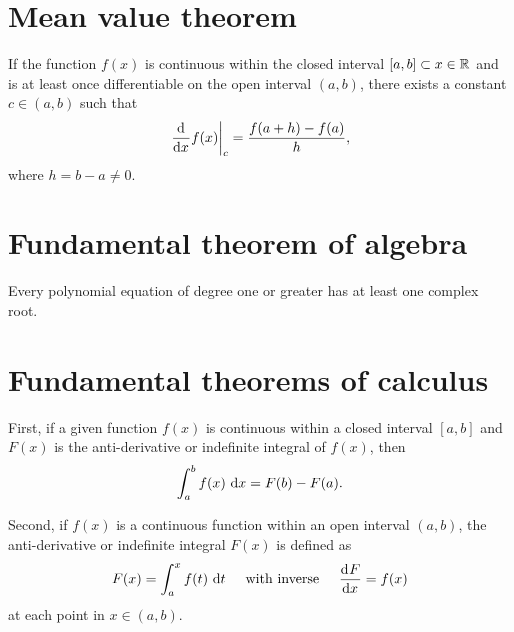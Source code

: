 \section{Mean value theorem} \label{ssn_mean_value_theorem}

\begin{theorem}
\label{mean_value_theorem}
If the function $f(x)$ is continuous within the closed interval $[a,b] \subset x \in \mathbb{R}$ and is at least once differentiable on the open interval $(a,b)$, there exists a constant $c \in (a,b)$ such that 
\begin{align*}
  \left. \frac{\mathrm{d}{^{}} }{\mathrm{d} x{^{}} } f(x) \right|_c = \frac{f(a+h) - f(a)}{h},
\end{align*}
where $h = b - a \neq 0$.
\end{theorem}

\section{Fundamental theorem of algebra}

\begin{theorem}
\label{fundamental_theorem_of_algebra}
Every polynomial equation of degree one or greater has at least one complex root. 
\end{theorem}

\section{Fundamental theorems of calculus}

\begin{theorem}
\label{first_fundamental_theorem_of_calculus}
First, if a given function $f(x)$ is continuous within a closed interval $[a,b]$ and $F(x)$ is the anti-derivative or indefinite integral of $f(x)$, then
\begin{align*}
  \int_a^b f(x) \ \mathrm{d}x = F(b) - F(a).
\end{align*}
\end{theorem}

\begin{theorem}
\label{second_fundamental_theorem_of_calculus}
Second, if $f(x)$ is a continuous function within an open interval $(a,b)$, the anti-derivative or indefinite integral $F(x)$ is defined as
\begin{align*}
  F(x) = \int_a^x f(t) \ \mathrm{d}t \hspace{5mm} \text{with inverse} \hspace{5mm} 
  \frac{\mathrm{d}{^{}} F}{\mathrm{d} x{^{}} } = f(x)
\end{align*}
at each point in $x \in (a,b)$.
\end{theorem}

